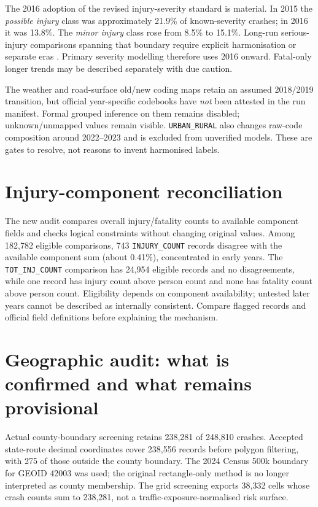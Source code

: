 \documentclass[11pt,a4paper,openany]{report}
\newcommand{\pathcode}[1]{\nolinkurl{#1}}
\begin{document}
The 2016 adoption of the revised injury-severity standard is material. In 2015 the \emph{possible injury} class was approximately 21.9\% of known-severity crashes; in 2016 it was 13.8\%. The \emph{minor injury} class rose from 8.5\% to 15.1\%. Long-run serious-injury comparisons spanning that boundary require explicit harmonisation or separate eras \cite{PennDOT2016}. Primary severity modelling therefore uses 2016 onward. Fatal-only longer trends may be described separately with due caution.

The weather and road-surface old/new coding maps retain an assumed 2018/2019 transition, but official year-specific codebooks have \emph{not} been attested in the run manifest. Formal grouped inference on them remains disabled; unknown/unmapped values remain visible. \pathcode{URBAN_RURAL} also changes raw-code composition around 2022--2023 and is excluded from unverified models. These are gates to resolve, not reasons to invent harmonised labels.

\section{Injury-component reconciliation}
The new audit compares overall injury/fatality counts to available component fields and checks logical constraints without changing original values. Among 182,782 eligible comparisons, 743 \pathcode{INJURY_COUNT} records disagree with the available component sum (about 0.41\%), concentrated in early years. The \pathcode{TOT_INJ_COUNT} comparison has 24,954 eligible records and no disagreements, while one record has injury count above person count and none has fatality count above person count. Eligibility depends on component availability; untested later years cannot be described as internally consistent. Compare flagged records and official field definitions before explaining the mechanism.

\section{Geographic audit: what is confirmed and what remains provisional}
Actual county-boundary screening retains 238,281 of 248,810 crashes. Accepted state-route decimal coordinates cover 238,556 records before polygon filtering, with 275 of those outside the county boundary. The 2024 Census 500k boundary for GEOID 42003 was used; the original rectangle-only method is no longer interpreted as county membership. The grid screening exports 38,332 cells whose crash counts sum to 238,281, not a traffic-exposure-normalised risk surface.
\end{document}
